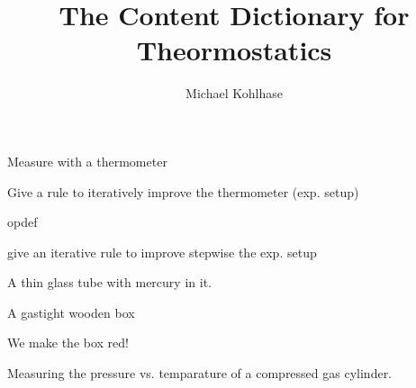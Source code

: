 \documentclass[twoside]{article}
\title{The Content Dictionary for Theormostatics}
\author{Michael Kohlhase}
\begin{document}
\maketitle

\begin{module}[id=thermostatics]

\begin{observable}[name=temparature]
  \begin{opdef}
    Measure with a thermometer
  \end{opdef}
  \begin{refinement}
Give a rule to iteratively improve the thermometer (exp. setup)
  \end{refinement}
\end{observable}

\begin{observable}[name=density]
  \begin{opdef}
    opdef
  \end{opdef}
  \begin{refinement}
    give an iterative rule to improve stepwise the exp. setup
  \end{refinement}
\end{observable}

\begin{system}[id=mercury-thermometer]
  \begin{realization}
    A thin glass tube with mercury in it.
  \end{realization}
\end{system}

\begin{system}[id=gas-cylinder]
  \begin{realization}
    A gastight wooden box
  \end{realization}
  \begin{preparation}We make the box red!\end{preparation}
  \begin{state}
  \end{state}
\end{system}
\begin{experiment}[id=ex-pressure-vs-temp]
  Measuring the pressure vs. temparature of a compressed gas cylinder.
  \begin{measurement}[id=m-213]
    \begin{state}[of=gas-cylinder]
    \end{state}
    \begin{state}[of=mercury-theormometer]
    \end{state}
  \end{measurement}
\end{experiment}


\end{module}
\end{document}

